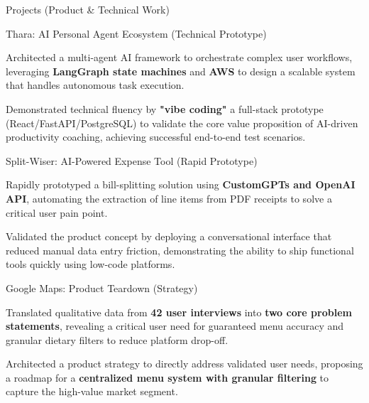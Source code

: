 \documentclass{resume} %
\begin{document}
\begin{rSection}{Projects (Product \& Technical Work) \vspace{.1em}}

\begin{rSubsection}{Thara: AI Personal Agent Ecosystem (Technical Prototype)}{}{}{}
\begin{itemize}[left=-1.5em, labelsep=.1cm, labelwidth=.2cm, itemsep=0.0em]
{\item Architected a multi-agent AI framework to orchestrate complex user workflows, leveraging \textbf{LangGraph state machines} and \textbf{AWS} to design a scalable system that handles autonomous task execution.}
{\item Demonstrated technical fluency by \textbf{"vibe coding"} a full-stack prototype (React/FastAPI/PostgreSQL) to validate the core value proposition of AI-driven productivity coaching, achieving successful end-to-end test scenarios.}
\end{itemize}
\end{rSubsection}

\begin{rSubsection}{Split-Wiser: AI-Powered Expense Tool (Rapid Prototype)}{}{}{}
\begin{itemize}[left=-1.5em, labelsep=.1cm, labelwidth=.2cm, itemsep=0.0em]
{\item Rapidly prototyped a bill-splitting solution using \textbf{CustomGPTs and OpenAI API}, automating the extraction of line items from PDF receipts to solve a critical user pain point.}
{\item Validated the product concept by deploying a conversational interface that reduced manual data entry friction, demonstrating the ability to ship functional tools quickly using low-code platforms.}
\end{itemize}
\end{rSubsection}

\begin{rSubsection}{Google Maps: Product Teardown (Strategy)}{}{}{}
\begin{itemize}[left=-1.5em, labelsep=.1cm, labelwidth=.2cm, itemsep=0.0em]
{\item Translated qualitative data from \textbf{42 user interviews} into \textbf{two core problem statements}, revealing a critical user need for guaranteed menu accuracy and granular dietary filters to reduce platform drop-off.}
{\item Architected a product strategy to directly address validated user needs, proposing a roadmap for a \textbf{centralized menu system with granular filtering} to capture the high-value market segment.}
\end{itemize}
\end{rSubsection}


\end{rSection}
\end{document}
